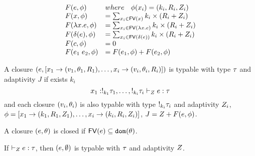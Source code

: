 \[
\begin{array}{ll}
 F(\expr, \phi ) & where \eapp ~~ \phi(x_i) = (\idx_i, \adapt_i, \nnatA_i ) \\
   F(x,\phi) & = \sum_{x_i \in \fv{x}  } \idx_i \times (\adapt_i+ \nnatA_i)  \\
F(\lambda x. \expr ,  \phi  ) & =  \sum_{x_i \in \fv{\lambda x.\expr}  } \idx_i \times (\adapt_i+ \nnatA_i)   \\  %
F(\delta(\expr) , \phi ) & = \sum_{x_i \in \fv{\delta(\expr)} } \idx_i \times (\adapt_i+ \nnatA_i)  \\
F(c, \phi ) & = 0  \\
F(\expr_1 \eapp \expr_2, \phi ) & = F(\expr_1, \phi ) +
                                        F(\expr_2,\phi )
\end{array} 
\]

\begin{defn}[Typable]
  \label{typable}
  A closure $( e, [ x_1 \to (v_1 ,  \theta_1 , R_1 ) , \ldots, x_i \to (v_i, \theta_i, R_i )] )$ is typable with type $\tau$ and adaptivity $J$ if exists $k_i$\\
  \[
     x_1 : !_{k_1} \tau_1, \ldots, !_{k_i} \tau_i 
     \vdash_{Z}  e : \tau  \]
   and each closure $(v_i, \theta_i)$  is also typable with type $!_{k_i} \tau_i$ and adaptivity $Z_i$, $ \phi = [x_1
     \to (k_1, R_1, Z_1), \ldots,  x_i \to (k_i, R_i,
     Z_i)  ] $,  $J = Z + F( e, \phi ) $.
 \end{defn}

 \begin{defn}[ClosedClosure]
  \label{closure}
   A closure $(e, \theta)$ is closed if $\mathsf{FV} (e) \subseteq \mathtt{dom}(\theta)$. 
 \end{defn}

 

\begin{lem}[programTypable]
  \label{proglemma}
   If $ \vdash_{Z}   e : \tau $, then $(
     e, \emptyset ) $ is typable with $\tau$ and adaptivity $Z$. 
   \end{lem}

